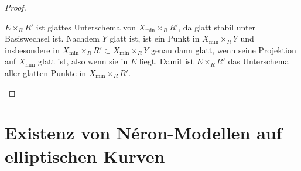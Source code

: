 \documentclass[german]{scrreprt}
\begin{document}
\begin{Satz}
\begin{proof}
\begin{enumerate}[label=(\roman*)]
      $E\times_R R'$ ist glattes Unterschema von
      $X_{\text{min}}\times_R R'$, da glatt stabil unter Basiswechsel
      ist. Nachdem $Y$ glatt ist, ist ein Punkt in
      $X_{\text{min}}\times_R Y$ und insbesondere in
      $X_{\text{min}}\times_R R'\subset
      X_{\text{min}}\times_R Y$ genau dann glatt, wenn seine
      Projektion auf $X_{\text{min}}$ glatt ist, also wenn sie in $E$
      liegt. Damit ist $E\times_R R'$ das Unterschema aller glatten
      Punkte in $X_{\text{min}}\times_R R'$.
    \end{enumerate}
  \end{proof}
\end{Satz}




\chapter{Existenz von Néron-Modellen auf elliptischen Kurven}
\end{document}
